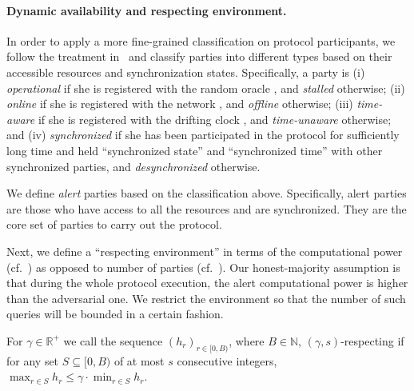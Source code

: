 

\paragraph{Dynamic availability and respecting environment.}
%
In order to apply a more fine-grained classification on protocol participants, we follow the treatment in~\cite{CCS:BGKRZ18} and classify parties into different types based on their accessible resources and synchronization states.
%
Specifically, a party is (i) \emph{operational} if she is registered with the random oracle \funcRO, and \emph{stalled} otherwise; (ii) \emph{online} if she is registered with the network \funcDiffuse, and \emph{offline} otherwise; (iii) \emph{time-aware} if she is registered with the drifting clock \funcDriftingClock, and \emph{time-unaware} otherwise; and (iv) \emph{synchronized} if she has been participated in the protocol for sufficiently long time and held ``synchronized state'' and ``synchronized time'' with other synchronized parties, and \emph{desynchronized} otherwise.

We define \emph{alert} parties based on the classification above.
%
Specifically, alert parties are those who have access to all the resources and are synchronized.
%
They are the core set of parties to carry out the protocol.

Next, we define a ``respecting environment'' in terms of the computational power (cf.~\cite{TCC:GarKiaShe22}) as opposed to number of parties (cf.~\cite{C:GarKiaLeo17,EPRINT:GarKiaLeo20}).
%
Our honest-majority assumption is that during the whole protocol execution, the alert computational power is higher than the adversarial one.
%
We restrict the environment so that the number of such queries will be bounded in a certain fashion.

\begin{definition} \label{def:respecting-environment}
    For $\gamma \in \mathbb{R}^+$ we call the sequence $(h_r)_{r \in [0, B)}$, where $B \in \mathbb{N}$, $(\gamma, s)$-respecting if for any set $S \subseteq [0, B)$ of at most $s$ consecutive integers, $\max_{r \in S} h_r \le \gamma \cdot \min_{r \in S} h_r$.
\end{definition}
